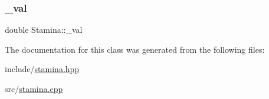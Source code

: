 \subsubsection{\texorpdfstring{\+\_\+val}{\_val}}
{\footnotesize\ttfamily double Stamina\+::\+\_\+val\hspace{0.3cm}{\ttfamily [private]}}



The documentation for this class was generated from the following files\+:\begin{DoxyCompactItemize}
\item 
include/\hyperlink{stamina_8hpp}{stamina.\+hpp}\item 
src/\hyperlink{stamina_8cpp}{stamina.\+cpp}\end{DoxyCompactItemize}
